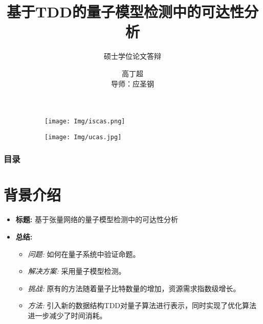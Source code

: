 \documentclass[aspectratio=1610]{ctexbeamer}
\title[学位论文答辩]{基于TDD的量子模型检测中的可达性分析}
\subtitle{硕士学位论文答辩}
\author[Gc]{高丁超\\ 导师：应圣钢}
\institute[ISCAS]{中国科学院软件研究所}
\begin{document}
\begin{frame}[plain]
    \titlepage
    \begin{figure}
        \centering
        \begin{subfigure}[c]{0.4\textwidth}
            \centering
            \texttt{[image: Img/iscas.png]}
        \end{subfigure}
        \qquad
        \begin{subfigure}[c]{0.4\textwidth}
            \centering
            \texttt{[image: Img/ucas.jpg]}
        \end{subfigure}
    \end{figure}
\end{frame}
\begin{frame}
    \frametitle{目录}
    \tableofcontents
\end{frame}

\section{背景介绍}

\begin{frame}
    \begin{itemize}
        \item \textbf{标题:} 基于张量网络的量子模型检测中的可达性分析
        \item \textbf{总结:}
        \begin{itemize}
            \setlength\itemsep{1em} %
            \item \textit{问题:} 如何在量子系统中验证命题。
            \item \textit{解决方案:} 采用量子模型检测。
            \item \textit{挑战:} 原有的方法随着量子比特数量的增加，资源需求指数级增长。
            \item \textit{方法:} 引入新的数据结构TDD对量子算法进行表示，同时实现了优化算法进一步减少了时间消耗。
        \end{itemize}
    \end{itemize}
\end{frame}
\end{document}
